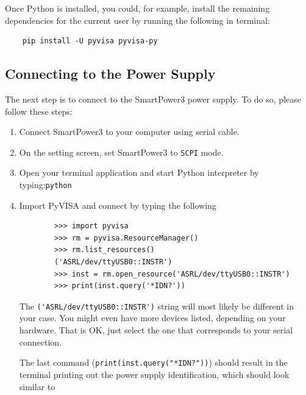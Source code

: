 \documentclass[a4paper,10pt]{article}
\begin{document}
Once Python is installed, you could, for example, install the remaining dependencies for the current user by running the following in terminal:
\begin{verbatim}
    pip install -U pyvisa pyvisa-py
\end{verbatim}

\subsection{Connecting to the Power Supply}

The next step is to connect to the SmartPower3 power supply. To do so, please follow these steps:
\begin{enumerate}

    \item Connect SmartPower3 to your computer using serial cable.
    \item On the setting screen, set SmartPower3 to \verb|SCPI| mode.
    \item Open your terminal application and start Python interpreter by typing:\newline\verb|python|
    \item Import PyVISA and connect by typing the following
    \begin{verbatim}
        >>> import pyvisa
        >>> rm = pyvisa.ResourceManager()
        >>> rm.list_resources()
        ('ASRL/dev/ttyUSB0::INSTR')
        >>> inst = rm.open_resource('ASRL/dev/ttyUSB0::INSTR')
        >>> print(inst.query('*IDN?'))
    \end{verbatim}
    The \verb|('ASRL/dev/ttyUSB0::INSTR')| string will most likely be different in your case. You might even have more devices listed, depending on your hardware. That is OK, just select the one that corresponds to your serial connection.
    
    The last command (\verb|print(inst.query("*IDN?"))|) should result in the terminal printing out the power supply identification, which should look similar to 
    

\end{enumerate}
\end{document}
